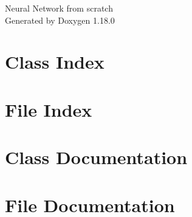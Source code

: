 \documentclass[twoside]{book}
\newcommand{\+}{\discretionary{\mbox{\scriptsize$\hookleftarrow$}}{}{}}
\newcommand{\clearemptydoublepage}{%
    \newpage{\pagestyle{empty}\cleardoublepage}%
  }
\begin{document}
  \raggedbottom
    \hypersetup{pageanchor=false,
                bookmarksnumbered=true,
                pdfencoding=unicode
               }
  \begin{titlepage}
  \vspace*{7cm}
  \begin{center}%
  {\Large Neural Network from scratch}\\
  \vspace*{1cm}
  {\large Generated by Doxygen 1.18.0}\\
  \end{center}
  \end{titlepage}
  \clearemptydoublepage
  \tableofcontents
  \clearemptydoublepage
  \hypersetup{pageanchor=true}

\chapter{Class Index}

\chapter{File Index}

\chapter{Class Documentation}


\chapter{File Documentation}





  \backmatter
  \newpage
  \clearemptydoublepage
  \printindex
\end{document}
